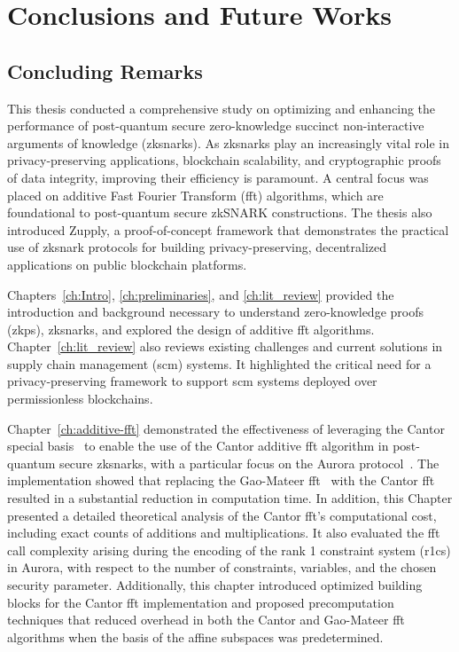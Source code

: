 \chapter{Conclusions and Future Works} \label{ch:conclusion}


\section{Concluding Remarks}
This thesis conducted a comprehensive study on optimizing and enhancing the performance of post-quantum secure zero-knowledge succinct non-interactive arguments of knowledge (\glspl{zksnark}). As \glspl{zksnark} play an increasingly vital role in privacy-preserving applications, blockchain scalability, and cryptographic proofs of data integrity, improving their efficiency is paramount. A central focus was placed on additive Fast Fourier Transform (\gls{fft}) algorithms, which are foundational to post-quantum secure zkSNARK constructions. The thesis also introduced Zupply, a proof-of-concept framework that demonstrates the practical use of \gls{zksnark} protocols for building privacy-preserving, decentralized applications on public blockchain platforms.


Chapters~\ref{ch:Intro}, \ref{ch:preliminaries}, and \ref{ch:lit_review} provided the introduction and background necessary to understand zero-knowledge proofs (\glspl{zkp}), \glspl{zksnark}, and explored the design of additive \gls{fft} algorithms. Chapter~\ref{ch:lit_review} also reviews existing challenges and current solutions in supply chain management (\gls{scm}) systems. It highlighted the critical need for a privacy-preserving framework to support \gls{scm} systems deployed over permissionless blockchains.

Chapter~\ref{ch:additive-fft} demonstrated the effectiveness of leveraging the Cantor special basis~\cite{Cantor1989FFT} to enable the use of the Cantor additive \gls{fft} algorithm in post-quantum secure \glspl{zksnark}, with a particular focus on the Aurora protocol~\cite{Aurora2019}. The implementation showed that replacing the Gao-Mateer \gls{fft}~\cite{Gao2010FFT} with the Cantor \gls{fft} resulted in a substantial reduction in computation time. In addition, this Chapter presented a detailed theoretical analysis of the Cantor \gls{fft}'s computational cost, including exact counts of additions and multiplications. It also evaluated the \gls{fft} call complexity arising during the encoding of the  rank 1 constraint system (\gls{r1cs}) in Aurora, with respect to the number of constraints, variables, and the chosen security parameter. Additionally, this chapter introduced optimized building blocks for the Cantor \gls{fft} implementation and proposed precomputation techniques that reduced overhead in both the Cantor and Gao-Mateer \gls{fft} algorithms when the basis of the affine subspaces was predetermined.

